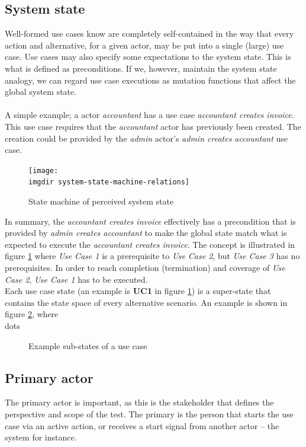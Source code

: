 \subsection{System state}
Well-formed use cases  know are completely self-contained\cite{larman2005} in the way that every action and alternative, for a given actor, may be put into a single (large) use case. Use cases may also specify some expectations to the system state. This is what is defined as preconditions. If we, however, maintain the system state analogy, we can regard use case executions as mutation functions that affect the global system state.\\\\
A simple example; a actor \emph{accountant} has a use case \emph{accountant creates invoice}. This use case requires that the \emph{accountant} actor has previously been created. The creation could be provided by the \emph{admin} actor's \emph{admin creates accountant} use case.
\begin{figure}[h]
\texttt{[image: \\imgdir system-state-machine-relations]}
\centering
\caption{State machine of perceived system state}
\label{fig:system-state-machine-relations}
\end{figure}
In summary, the \emph{accountant creates invoice} effectively has a precondition that is provided by \emph{admin creates accountant} to make the global state match what is expected to execute the \emph{accountant creates invoice}. The concept is illustrated in figure \ref{fig:system-state-machine-relations} where \emph{Use Case 1} is a prerequisite to \emph{Use Case 2}, but \emph{Use Case 3} has no prerequisites. In order to reach completion (termination) and coverage of \emph{Use Case 2}, \emph{Use Case 1} has to be executed.\\
Each use case state (an example is \textbf{UC1} in figure \ref{fig:system-state-machine-relations}) is a super-state that contains the state space of every alternative scenario. An example is shown in figure \ref{fig:system-sub-state-machine-relations}, where \\dots %
\begin{figure}[h]
\centering
\caption{Example sub-states of a use case}
\label{fig:system-sub-state-machine-relations}
\end{figure}

\subsection{Primary actor}
The primary actor is important, as this is the stakeholder that defines the perspective and scope of the test. The primary is the person that starts the use case via an active action, or receives a start signal from another actor -- the system for instance.

